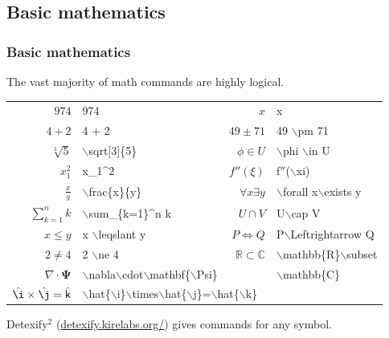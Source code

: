 \documentclass[ignorenonframetext]{beamer}
\begin{document}
\subsection{Basic mathematics}
\begin{frame}
  \frametitle{Basic mathematics}
  The vast majority of math commands are highly logical.

  \begin{tabular}{r l r l}
    $974$ & 974 & $x$ & x\\
    $4 + 2$ & 4 + 2 & $49 \pm 71$ & 49 $\backslash$pm 71\\
    $\sqrt[3]{5}$ & $\backslash$sqrt[3]\{5\} & $\phi \in U$ & $\backslash$phi $\backslash$in U\\
    $x_1^2$ & x\_1\^{}2 & $f''(\xi)$ & f$''$($\backslash$xi)\\
    $\frac{x}{y}$ & $\backslash$frac\{x\}\{y\} & $\forall x\exists y$ & $\backslash$forall x$\backslash$exists y\\
    $\sum_{k=1}^{n} k$ & $\backslash$sum\_\{k=1\}\^{}n k & $U \cap V$ & U$\backslash$cap V\\
    $x \leqslant y$ & x $\backslash$leqslant y & $P \Leftrightarrow Q$ & P$\backslash$Leftrightarrow Q\\
    $2 \ne 4$ & 2 $\backslash$ne 4 & $\mathbb{R} \subset \mathbb{C}$ & $\backslash$mathbb\{R\}$\backslash$subset\\
    $\nabla \cdot \mathbf{\Psi}$ & $\backslash$nabla$\backslash$cdot$\backslash$mathbf\{$\backslash$Psi\} && $\backslash$mathbb\{C\}\\
    $\hat{\i}\times\hat{\j}=\hat{\mathsf{k}}$ & \multicolumn{3}{l}{$\backslash$hat\{$\backslash$i\}$\backslash$times$\backslash$hat\{$\backslash$j\}=$\backslash$hat\{$\backslash$k\}}\\
  \end{tabular}

  Detexify$^2$ (\url{detexify.kirelabs.org/}) gives commands for
  any symbol.
\end{frame}
\end{document}
